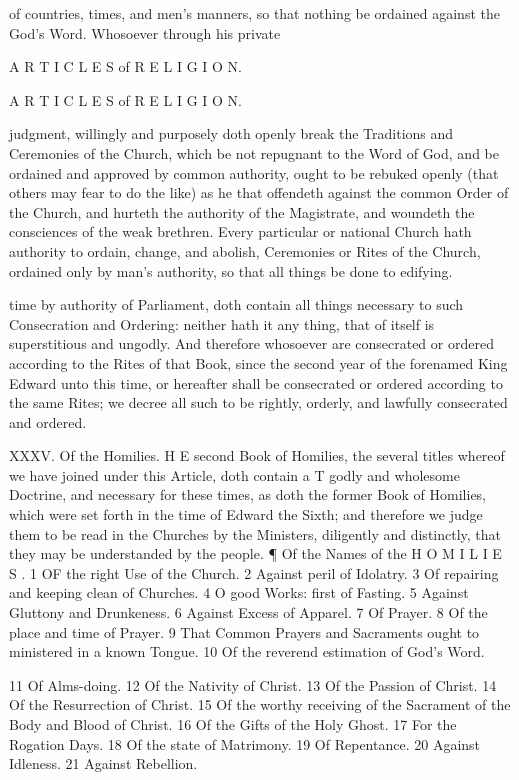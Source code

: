 of countries, times, and men’s manners, so that nothing be ordained against the God’s Word. Whosoever through his private

A R T I C L E S of R E L I G I O N.

A R T I C L E S of R E L I G I O N.

judgment, willingly and purposely doth openly break the Traditions and Ceremonies of the Church, which be not repugnant to the Word of God, and be ordained and approved by common authority, ought to be rebuked openly (that others may fear to do the like) as he that offendeth against the common Order of the Church, and hurteth the authority of the Magistrate, and woundeth the consciences of the weak brethren. Every particular or national Church hath authority to ordain, change, and abolish, Ceremonies or Rites of the Church, ordained only by man’s authority, so that all things be done to edifying.

time by authority of Parliament, doth contain all things necessary to such Consecration and Ordering: neither hath it any thing, that of itself is superstitious and ungodly. And therefore whosoever are consecrated or ordered according to the Rites of that Book, since the second year of the forenamed King Edward unto this time, or hereafter shall be consecrated or ordered according to the same Rites; we decree all such to be rightly, orderly, and lawfully consecrated and ordered.

XXXV. Of the Homilies. H E second Book of Homilies, the several titles whereof we have joined under this Article, doth contain a T godly and wholesome Doctrine, and necessary for these times, as doth the former Book of Homilies, which were set forth in the time of Edward the Sixth; and therefore we judge them to be read in the Churches by the Ministers, diligently and distinctly, that they may be understanded by the people. ¶ Of the Names of the H O M I L I E S . 1 OF the right Use of the Church. 2 Against peril of Idolatry. 3 Of repairing and keeping clean of Churches. 4 O good Works: first of Fasting. 5 Against Gluttony and Drunkeness. 6 Against Excess of Apparel. 7 Of Prayer. 8 Of the place and time of Prayer. 9 That Common Prayers and Sacraments ought to ministered in a known Tongue. 10 Of the reverend estimation of God’s Word.

11 Of Alms-doing. 12 Of the Nativity of Christ. 13 Of the Passion of Christ. 14 Of the Resurrection of Christ. 15 Of the worthy receiving of the Sacrament of the Body and Blood of Christ. 16 Of the Gifts of the Holy Ghost. 17 For the Rogation Days. 18 Of the state of Matrimony. 19 Of Repentance. 20 Against Idleness. 21 Against Rebellion.

